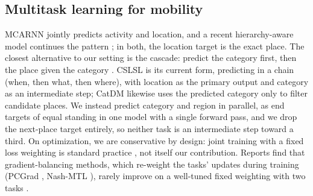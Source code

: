 \subsection{Multitask learning for mobility}
\label{sec:mobiwac:related-mtl}
MCARNN \cite{Liao2018} jointly predicts activity and
location, and a recent hierarchy-aware model continues the
pattern \cite{wang2025hamtl}; in both, the location target is
the exact place. The closest alternative to our setting is
the cascade: predict the category first, then the place given the
category \cite{ye2013nextmove}. CSLSL
\cite{huang2024cslsl} is its current form, predicting in a chain (when, then what,
then where), with location as the primary output and category as an
intermediate step; CatDM \cite{yu2020catdm} likewise uses the predicted
category only to filter candidate places. We instead predict
category and region in parallel, as end targets of equal standing in one model
with a single forward pass, and we drop the next-place target entirely, so
neither task is an intermediate step toward a third. On optimization, we are conservative by design: joint
training with a fixed loss weighting is standard practice
\cite{caruana1997multitask}, not itself our contribution.
Reports find that gradient-balancing methods, which re-weight
the tasks' updates during training (PCGrad \cite{yu2020pcgrad}, Nash-MTL \cite{nash}), rarely improve on a
well-tuned fixed weighting with two tasks \cite{xin2022domtl}.
